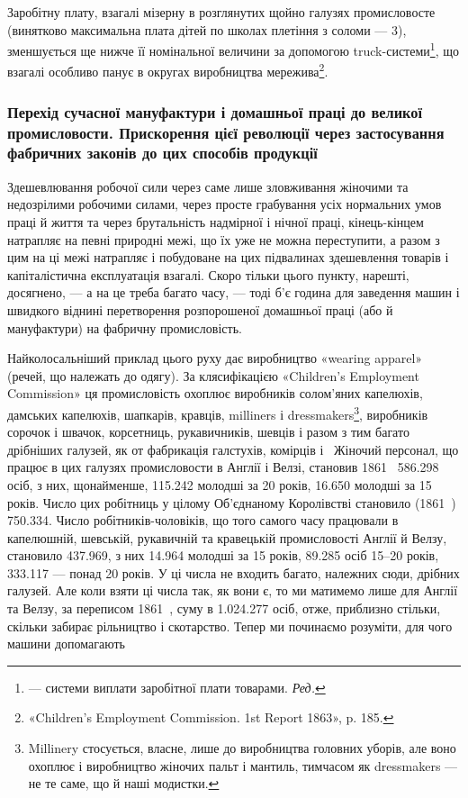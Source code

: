 
Заробітну плату, взагалі мізерну в розглянутих щойно галузях
промисловосте (винятково максимальна плата дітей по школах
плетіння з соломи — 3), зменшується ще нижче її номінальної
величини за допомогою truck-системи\footnote*{
— системи виплати заробітної плати товарами. \emph{Ред.}
}, що взагалі особливо панує в округах виробництва мережива\footnote{
«Children’s Employment Commission. 1st Report 1863», p. 185.
}.

\subsubsection{Перехід сучасної мануфактури і домашньої
праці до великої промисловости. Прискорення
цієї революції через застосування фабричних
законів до цих способів продукції}

Здешевлювання робочої сили через саме лише зловживання
жіночими та недозрілими робочими силами, через просте грабування
усіх нормальних умов праці й життя та через брутальність
надмірної і нічної праці, кінець-кінцем натрапляє на певні природні
межі, що їх уже не можна переступити, а разом з цим
на ці межі натрапляє і побудоване на цих підвалинах здешевлення
товарів і капіталістична експлуатація взагалі. Скоро тільки цього
пункту, нарешті, досягнено, — а на це треба багато часу, — тоді
б’є година для заведення машин і швидкого віднині перетворення
розпорошеної домашньої праці (або й мануфактури) на фабричну
промисловість.

Найколосальніший приклад цього руху дає виробництво «wearing
apparel» (речей, що належать до одягу). За клясифікацією
«\textenglish{Children’s Employment Commission}» ця промисловість охоплює
виробників солом’яних капелюхів, дамських капелюхів, шапкарів,
кравців, milliners і dressmakers\footnote{
Millinery стосується, власне, лише до виробництва головних уборів,
але воно охоплює і виробництво жіночих пальт і мантиль, тимчасом
як dressmakers — не те саме, що й наші модистки.
}, виробників сорочок і швачок,
корсетниць, рукавичників, шевців і разом з тим багато дрібніших
галузей, як от фабрикація галстухів, комірців і~ Жіночий
персонал, що працює в цих галузях промисловости в Англії і
Велзі, становив 1861~ \num{586.298} осіб, з них, щонайменше, \num{115.242}
молодші за 20 років, \num{16.650} молодші за 15 років. Число цих робітниць
у цілому Об’єднаному Королівстві становило (1861~)
\num{750.334}. Число робітників-чоловіків, що того самого часу працювали
в капелюшній, шевській, рукавичній та кравецькій промисловості
Англії й Велзу, становило \num{437.969}, з них \num{14.964} молодші
за 15 років, \num{89.285} осіб 15--20 років, \num{333.117} — понад 20 років.
У ці числа не входить багато, належних сюди, дрібних галузей.
Але коли взяти ці числа так, як вони є, то ми матимемо лише для
Англії та Велзу, за переписом 1861~, суму в \num{1.024.277} осіб,
отже, приблизно стільки, скільки забирає рільництво і скотарство.
Тепер ми починаємо розуміти, для чого машини допомагають
\parbreak{}  %
